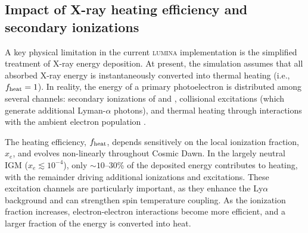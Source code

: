 \documentclass[apj,twocolumn, appendixfloats, twocolappendix, numberedappendix, tighten]{openjournal}
\DeclareRobustCommand{\lumina}{\mbox{\textsc{lumina}}\xspace}
\begin{document}




\subsection{Impact of X-ray heating efficiency and secondary ionizations} \label{sec:xray_heating}


A key physical limitation in the current \lumina implementation is the simplified treatment of X-ray energy deposition. At present, the simulation assumes that all absorbed X-ray energy is instantaneously converted into thermal heating (i.e., $f_{\rm heat} = 1$). In reality, the energy of a primary photoelectron is distributed among several channels: secondary ionizations of  and , collisional excitations (which generate additional Lyman-$\alpha$ photons), and thermal heating through interactions with the ambient electron population \citep{Shull1985, Valdes2008}.


The heating efficiency, $f_{\rm heat}$, depends sensitively on the local ionization fraction, $x_e$, and evolves non-linearly throughout Cosmic Dawn. In the largely neutral IGM ($x_e \lesssim 10^{-4}$), only $\sim 10$--30\% of the deposited energy contributes to heating, with the remainder driving additional ionizations and excitations. These excitation channels are particularly important, as they enhance the Ly$\alpha$ background and can strengthen spin temperature coupling. As the ionization fraction increases, electron-electron interactions become more efficient, and a larger fraction of the energy is converted into heat.
\end{document}
